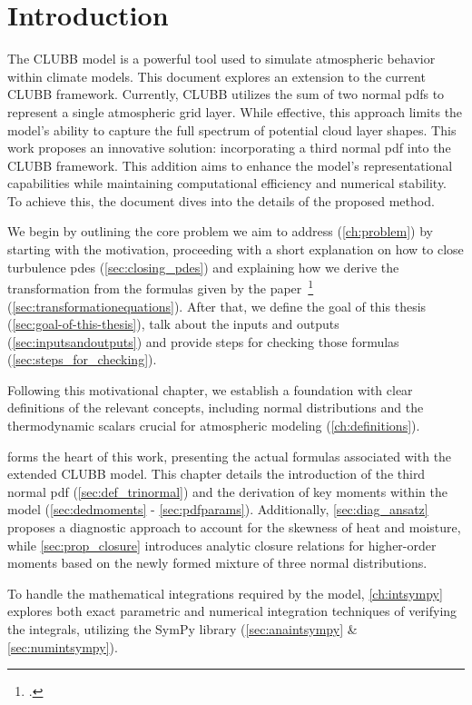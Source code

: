 \chapter{Introduction}\label{ch:introduction}

The \gls{CLUBB} model is a powerful tool used to simulate atmospheric behavior within climate models.
This document explores an extension to the current \gls{CLUBB} framework.
Currently, \gls{CLUBB} utilizes the sum of two normal \glspl{pdf}
to represent a single atmospheric grid layer.
While effective,
this approach limits the model's ability to capture the full spectrum of potential cloud layer shapes.
This work proposes an innovative solution:
incorporating a third normal \gls{pdf} into the \gls{CLUBB} framework.
This addition aims to enhance the model's representational capabilities
while maintaining computational efficiency and numerical stability.
To achieve this, the document dives into the details of the proposed method.

We begin by outlining the core problem we aim to address (\cref{ch:problem})
by starting with the motivation,
proceeding with a short explanation on how to close turbulence \glspl{pde} (\cref{sec:closing_pdes})
and explaining how we derive the transformation from the formulas
given by the paper~\footcite{larson2005using} (\cref{sec:transformationequations}).
After that, we define the goal of this thesis (\cref{sec:goal-of-this-thesis}),
talk about the inputs and outputs (\cref{sec:inputsandoutputs})
and provide steps for checking those formulas (\cref{sec:steps_for_checking}).

Following this motivational chapter,
we establish a foundation with clear definitions of the relevant concepts,
including normal distributions and the thermodynamic scalars
crucial for atmospheric modeling (\cref{ch:definitions}).

 forms the heart of this work,
presenting the actual formulas associated with the extended \gls{CLUBB} model.
This chapter details the introduction of the third normal \gls{pdf} (\cref{sec:def_trinormal})
and the derivation of key moments within the model (\cref{sec:dedmoments} - \cref{sec:pdfparams}).
Additionally,
\cref{sec:diag_ansatz} proposes a diagnostic approach
to account for the skewness of heat and moisture,
while \cref{sec:prop_closure} introduces analytic closure relations
for higher-order moments based on the newly formed mixture of three normal distributions.

To handle the mathematical integrations required by the model,
\cref{ch:intsympy} explores both exact parametric
and numerical integration techniques of verifying the integrals,
utilizing the SymPy library (\cref{sec:anaintsympy} \& \cref{sec:numintsympy}).


